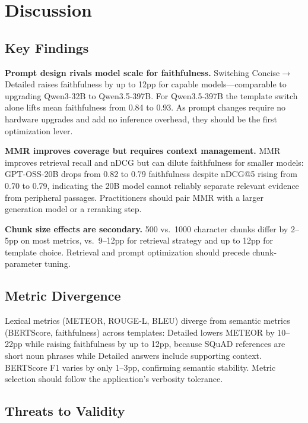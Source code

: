 \section{Discussion}
\label{sec:discussion}

\subsection{Key Findings}

\textbf{Prompt design rivals model scale for faithfulness.} Switching Concise$\rightarrow$Detailed raises faithfulness by up to 12pp for capable models---comparable to upgrading Qwen3-32B to Qwen3.5-397B. For Qwen3.5-397B the template switch alone lifts mean faithfulness from 0.84 to 0.93. As prompt changes require no hardware upgrades and add no inference overhead, they should be the first optimization lever.

\textbf{MMR improves coverage but requires context management.} MMR improves retrieval recall and nDCG but can dilute faithfulness for smaller models: GPT-OSS-20B drops from 0.82 to 0.79 faithfulness despite nDCG@5 rising from 0.70 to 0.79, indicating the 20B model cannot reliably separate relevant evidence from peripheral passages. Practitioners should pair MMR with a larger generation model or a reranking step.

\textbf{Chunk size effects are secondary.} 500 vs.\ 1000 character chunks differ by 2--5pp on most metrics, vs.\ 9--12pp for retrieval strategy and up to 12pp for template choice. Retrieval and prompt optimization should precede chunk-parameter tuning.

\subsection{Metric Divergence}

Lexical metrics (METEOR, ROUGE-L, BLEU) diverge from semantic metrics (BERTScore, faithfulness) across templates: Detailed lowers METEOR by 10--22pp while raising faithfulness by up to 12pp, because SQuAD references are short noun phrases while Detailed answers include supporting context. BERTScore F1 varies by only 1--3pp, confirming semantic stability. Metric selection should follow the application's verbosity tolerance.

\subsection{Threats to Validity}

